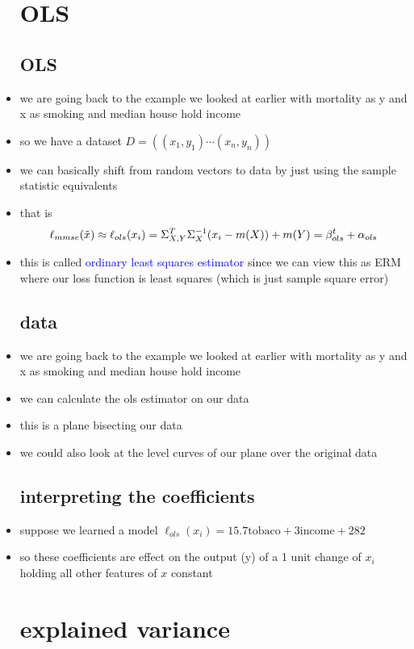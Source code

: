 \documentclass{article}
\begin{document}
\begin{itemize}
\section{OLS}
\subsection*{OLS}
\item we are going back to the example we looked at earlier with mortality as y and x as smoking and median house hold income
\item so we have a dataset $D=((x_1,y_1)\cdots (x_n,y_n))$
\item we can basically shift from random vectors to data by just using the sample statistic equivalents
\item that is $$\ell_{mmse}(\Tilde{x})\approx \ell_{ols}(x_i)=\Sigma^{T}_{X,Y}\Sigma_{X}^{-1}(x_i-m(X))+m(Y)=\beta_{ols}^{t}+\alpha_{ols} $$
\item this is called \textcolor{blue}{ordinary least squares estimator} since we can view this as ERM where our loss function is least squares (which is just sample square error)
\subsection*{data}
\item we are going back to the example we looked at earlier with mortality as y and x as smoking and median house hold income
\item we can calculate the ols estimator on our data 
\item this is a plane bisecting our data 
\item we could also look at the level curves of our plane over the original data 
\subsection*{interpreting the coefficients}
\item suppose we learned a model $\ell_{ols}(x_i)=15.7\text{tobaco}+3\text{income}+282$
\item so these  coefficients are effect on the output (y) of a 1 unit change of $x_i$ holding all other features of $x$ constant

\section{explained variance}

\end{itemize}
\end{document}
